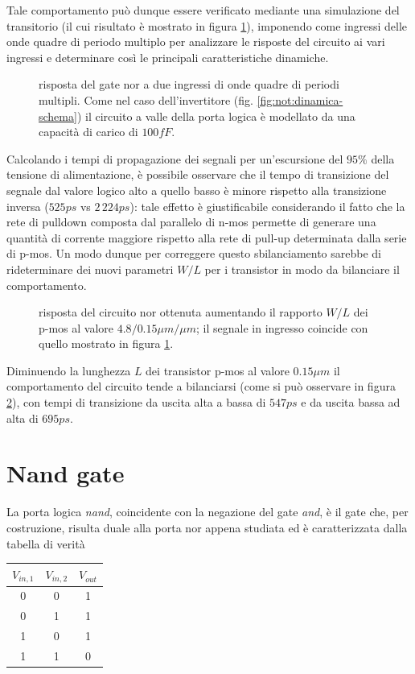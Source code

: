 	Tale comportamento può dunque essere verificato mediante una simulazione del transitorio (il cui risultato è mostrato in figura \ref{fig:nor:dinamica}), imponendo come ingressi delle onde quadre di periodo multiplo per analizzare le risposte del circuito ai vari ingressi e determinare così le principali caratteristiche dinamiche.
	
	\begin{figure}[bht]
		\centering
		
		\caption{risposta del gate nor a due ingressi di onde quadre di periodi multipli. Come nel caso dell'invertitore (fig. \ref{fig:not:dinamica-schema}) il circuito a valle della porta logica è modellato da una capacità di carico di $100fF$.}
		\label{fig:nor:dinamica}
	\end{figure}

	Calcolando i tempi di propagazione dei segnali per un'escursione del $95\%$ della tensione di alimentazione, è possibile osservare che il tempo di transizione del segnale dal valore logico alto a quello basso è minore rispetto alla transizione inversa ($525ps$ vs $2\,224 ps$): tale effetto è giustificabile considerando il fatto che la rete di pulldown composta dal parallelo di n-mos permette di generare una quantità di corrente maggiore rispetto alla rete di pull-up determinata dalla serie di p-mos. Un modo dunque per correggere questo sbilanciamento sarebbe di rideterminare dei nuovi parametri $W/L$ per i transistor in modo da bilanciare il comportamento.
	
	\begin{figure}[bht]
		\centering
		
		\vspace{3.5mm}
		\caption{risposta del circuito nor ottenuta aumentando il rapporto $W/L$ dei p-mos al valore $4.8/0.15 \mu m/\mu m$; il segnale in ingresso coincide con quello mostrato in figura \ref{fig:nor:dinamica}.}
		\label{fig:nor:dinamica-corretta}
	\end{figure}
	
	Diminuendo la lunghezza $L$ dei transistor p-mos al valore $0.15\mu m$ il comportamento del circuito tende a bilanciarsi (come si può osservare in figura \ref{fig:nor:dinamica-corretta}), con tempi di transizione da uscita alta a bassa di $547ps$ e da uscita bassa ad alta di $695ps$. 
	
\section{Nand gate}
	La porta logica \textit{nand}, coincidente con la negazione del gate \textit{and}, è il gate che, per costruzione, risulta duale alla porta nor appena studiata ed è caratterizzata dalla tabella di verità
	\begin{center}
		\begin{tabular}{c c | c}
			$V_{in,1}$ & $V_{in,2}$ & $V_{out}$ \\ \hline
			0 & 0 & 1 \\
			0 & 1 & 1 \\
			1 & 0 & 1 \\
			1 & 1 & 0 \\
		\end{tabular}
	\end{center}
	
